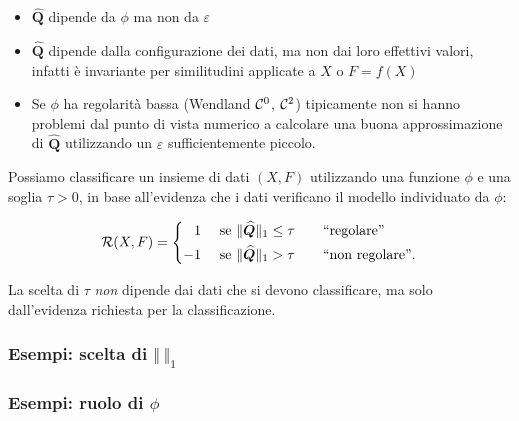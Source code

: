 \documentclass[10pt]{beamer}
\theoremstyle{definition}
\theoremstyle{plain}
\def\Cal#1{{\cal #1}}
\def\norm#1{\Vert #1\Vert}
\def\hbyw#1#2{\vbox to #1{\vfil \hbox to #2{\hfil}}}
\begin{document}
\begin{frame}
\begin{itemize}
\item $\widehat{\bm Q}$ dipende da $\phi$ ma non da $\varepsilon$
\item  $\widehat{\bm Q}$ dipende dalla configurazione dei dati, ma non dai loro effettivi valori, infatti è invariante per similitudini applicate a $X$ o $F = f(X)$
\item Se $\phi$ ha regolarità bassa (Wendland $\Cal C^0$, $\Cal C^2$) tipicamente non si hanno problemi dal punto di vista numerico a calcolare una buona approssimazione di $\widehat{\bm Q}$ utilizzando un $\varepsilon$ sufficientemente piccolo.
\end{itemize}

\bigskip
Possiamo classificare un insieme di dati $(X, F)$ utilizzando una funzione $\phi$ e una soglia $\tau>0$, in base all’evidenza che i dati verificano il modello individuato da $\phi$:

$$
\Cal R(X, F) = \begin{cases}
				\phantom{-}1& \text{ se $\norm{\widehat{\bm Q}}_1 \leq \tau$\qquad “regolare”} \\
				-1& \text{ se $\norm{\hbyw{3ex}{0em}\widehat{\bm Q}}_1 > \tau$\qquad “non regolare”}. 
			   \end{cases}
$$

La scelta di $\tau$  {\em non} dipende dai dati che si devono classificare, ma solo dall’evidenza richiesta per la classificazione.

\end{frame}



\begin{frame}
\frametitle{Esempi: scelta di $\norm{\>}_1$}
\end{frame}




\begin{frame}
\frametitle{Esempi: ruolo di $\phi$}
\end{frame}
\end{document}
